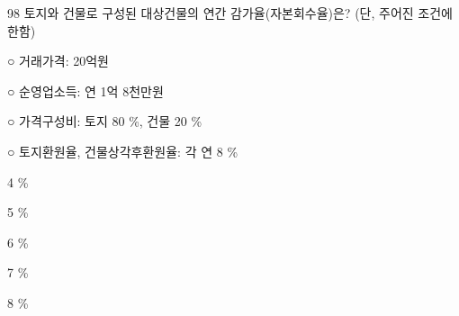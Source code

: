 \begin{question}{98}
토지와 건물로 구성된 대상건물의 연간 감가율(자본회수율)은? (단, 주어진 조건에 한함)
\begin{framedtext}
○ 거래가격: 20억원 \par
○ 순영업소득: 연 1억 8천만원 \par
○ 가격구성비: 토지 80 \%, 건물 20 \% \par
○ 토지환원율, 건물상각후환원율: 각 연 8 \% \par
\end{framedtext}
\begin{choices}
  \item 4 \%
  \item 5 \%
  \item 6 \%
  \item 7 \%
  \item 8 \%
\end{choices}
\end{question}
